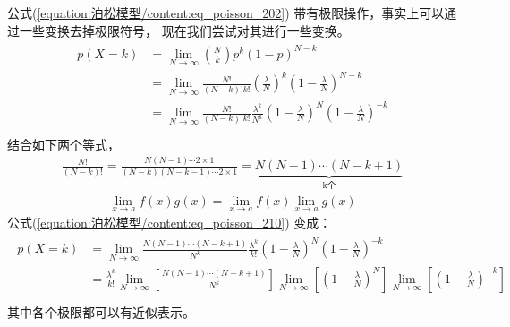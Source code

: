 \documentclass[letterpaper,10pt,english]{sphinxmanual}
\begin{document}
公式(\ref{equation:泊松模型/content:eq_poisson_202}) 带有极限操作，事实上可以通过一些变换去掉极限符号，
现在我们尝试对其进行一些变换。
\begin{align}\label{equation:泊松模型/content:eq_poisson_210}\!\begin{aligned}
p(X=k) &=
\lim_{N \to \infty} \binom{N}{k}
p^k
\left ( 1-p  \right )^{N-k}\\
&=
\lim_{N \to \infty} \frac{N!}{(N-k)!k!}
\left (\frac{\lambda}{N} \right )^k
\left ( 1-\frac{\lambda}{N} \right )^{N-k}\\
&=
\lim_{N \to \infty} \frac{N!}{(N-k)!k!} \frac{\lambda^k}{N^k}
\left ( 1-\frac{\lambda}{N} \right )^N
\left ( 1-\frac{\lambda}{N} \right )^{-k}\\
\end{aligned}\end{align}
结合如下两个等式，
\begin{equation}\label{equation:泊松模型/content:eq_poisson_211}
\begin{split}\frac{N!}{(N-k)!}
= \frac{N (N-1) \cdots 2\times  1}{(N-k)(N-k-1) \cdots 2\times 1}
= \underbrace{N (N-1) \cdots  (N-k+1)}_{\text{k个}}\end{split}
\end{equation}\begin{equation}\label{equation:泊松模型/content:eq_poisson_212}
\begin{split}\lim_{x \to a} f(x)g(x) = \lim_{x \to a} f(x)  \lim_{x \to a}g(x)\end{split}
\end{equation}
公式(\ref{equation:泊松模型/content:eq_poisson_210}) 变成：
\begin{align}\label{equation:泊松模型/content:eq_poisson_213}\!\begin{aligned}
p(X=k) &= \lim_{N \to \infty} \frac{N (N-1) \cdots  (N-k+1)}{N^k}
\frac{\lambda^k}{k!}
    \left ( 1-\frac{\lambda}{N} \right )^N
\left ( 1-\frac{\lambda}{N} \right )^{-k}\\
&=\frac{\lambda^k}{k!} \lim_{N \to \infty} \left [ \frac{N (N-1) \cdots  (N-k+1)}{N^k} \right ]
  \lim_{N \to \infty} \left [ \left ( 1-\frac{\lambda}{N} \right )^N \right ]
\lim_{N \to \infty}\left [  \left ( 1-\frac{\lambda}{N} \right )^{-k}\right ]\\
\end{aligned}\end{align}
其中各个极限都可以有近似表示。
\end{document}
